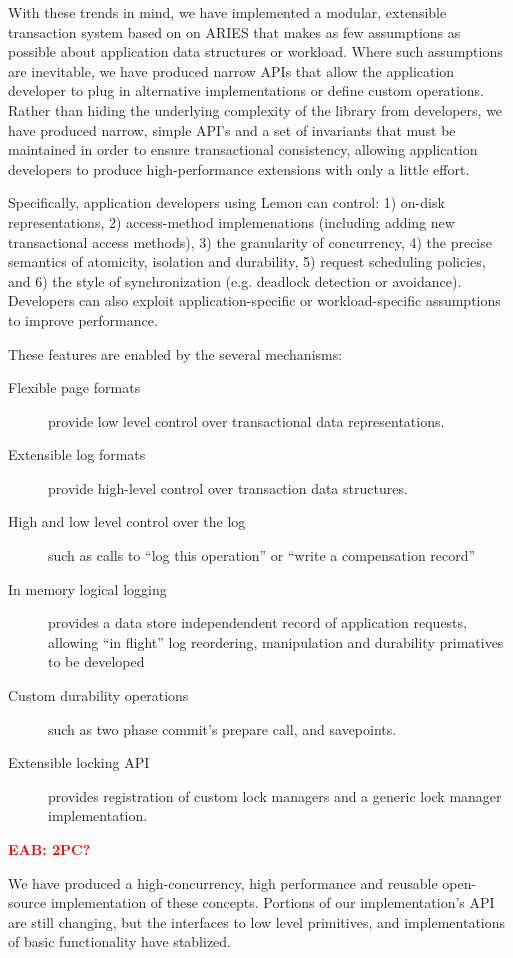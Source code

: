 \documentclass[letterpaper,twocolumn,english]{article}
\newcommand{\yad}{Lemon\xspace}
\newcommand{\eab}[1]{\textcolor{red}{\bf EAB: #1}}
\begin{document}
With these trends in mind, we have implemented a modular, extensible
transaction system based on on ARIES that makes as few assumptions as
possible about application data structures or workload. Where such
assumptions are inevitable, we have produced narrow APIs that allow
the application developer to plug in alternative implementations or
define custom operations. Rather than hiding the underlying complexity
of the library from developers, we have produced narrow, simple API's
and a set of invariants that must be maintained in order to ensure
transactional consistency, allowing application developers to produce
high-performance extensions with only a little effort.  

Specifically, application developers using \yad can control: 1)
on-disk representations, 2) access-method implemenations (including
adding new transactional access methods), 3) the granularity of
concurrency, 4) the precise semantics of atomicity, isolation and
durability, 5) request scheduling policies, and 6) the style of
synchronization (e.g. deadlock detection or avoidance).  Developers
can also exploit application-specific or workload-specific assumptions
to improve performance.

These features are enabled by the several mechanisms:
\begin{description}
\item[Flexible page formats] provide low level control over 
      transactional data representations.
\item[Extensible log formats] provide high-level control over
      transaction data structures.
\item [High and low level control over the log] such as calls to ``log this
      operation'' or ``write a compensation record''
\item [In memory logical logging] provides a data store independendent
      record of application requests, allowing ``in flight'' log
      reordering, manipulation and durability primatives to be
      developed
\item[Custom durability operations] such as two phase commit's
      prepare call, and savepoints.
\item[Extensible locking API] provides registration of custom lock managers
      and a generic lock manager implementation.
\item[\eab{2PC?}]
\end{description}

We have produced a high-concurrency, high performance and reusable
open-source implementation of these concepts.  Portions of our
implementation's API are still changing, but the interfaces to low
level primitives, and implementations of basic functionality have
stablized.  
\end{document}
